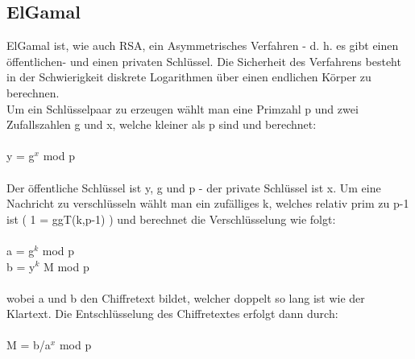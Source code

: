 \documentclass[10pt, a4paper,headsepline]{scrreprt}
\begin{document}
\subsection{ElGamal}
ElGamal ist, wie auch RSA, ein Asymmetrisches Verfahren - d. h. es gibt einen öffentlichen- und einen privaten Schlüssel. Die Sicherheit des Verfahrens besteht in der Schwierigkeit diskrete Logarithmen über einen endlichen Körper zu berechnen. \\
Um ein Schlüsselpaar zu erzeugen wählt man eine Primzahl p und zwei Zufallszahlen g und x, welche kleiner als p sind und berechnet: \\ \\
y = g$^{x}$ mod p \\ \\
Der öffentliche Schlüssel ist y, g und p - der private Schlüssel ist x. Um eine Nachricht zu verschlüsseln wählt man ein zufälliges k, welches relativ prim zu p-1 ist ( 1 = ggT(k,p-1) ) und berechnet die Verschlüsselung wie folgt: \\ \\
a = g$^{k}$ mod p \\
b = y$^{k}$ M mod p \\ \\
wobei a und b den Chiffretext bildet, welcher doppelt so lang ist wie der Klartext. Die Entschlüsselung des Chiffretextes erfolgt dann durch: \\ \\
M = b/a$^{x}$ mod p \\
\end{document}
